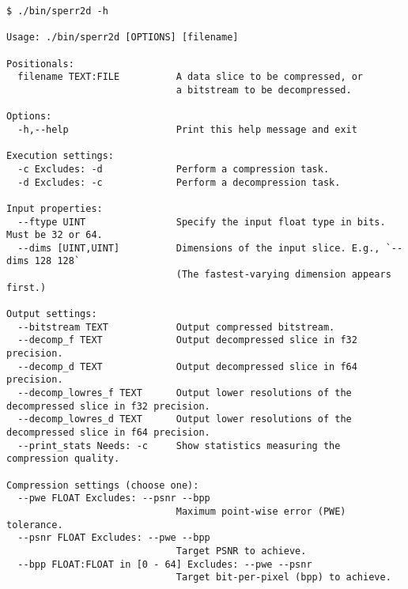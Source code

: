 \documentclass{article}
\begin{document}
\begin{verbatim}
$ ./bin/sperr2d -h

Usage: ./bin/sperr2d [OPTIONS] [filename]

Positionals:
  filename TEXT:FILE          A data slice to be compressed, or
                              a bitstream to be decompressed.

Options:
  -h,--help                   Print this help message and exit

Execution settings:
  -c Excludes: -d             Perform a compression task.
  -d Excludes: -c             Perform a decompression task.

Input properties:
  --ftype UINT                Specify the input float type in bits. Must be 32 or 64.
  --dims [UINT,UINT]          Dimensions of the input slice. E.g., `--dims 128 128`
                              (The fastest-varying dimension appears first.)

Output settings:
  --bitstream TEXT            Output compressed bitstream.
  --decomp_f TEXT             Output decompressed slice in f32 precision.
  --decomp_d TEXT             Output decompressed slice in f64 precision.
  --decomp_lowres_f TEXT      Output lower resolutions of the decompressed slice in f32 precision.
  --decomp_lowres_d TEXT      Output lower resolutions of the decompressed slice in f64 precision.
  --print_stats Needs: -c     Show statistics measuring the compression quality.

Compression settings (choose one):
  --pwe FLOAT Excludes: --psnr --bpp
                              Maximum point-wise error (PWE) tolerance.
  --psnr FLOAT Excludes: --pwe --bpp
                              Target PSNR to achieve.
  --bpp FLOAT:FLOAT in [0 - 64] Excludes: --pwe --psnr
                              Target bit-per-pixel (bpp) to achieve.
\end{verbatim}
\end{document}
